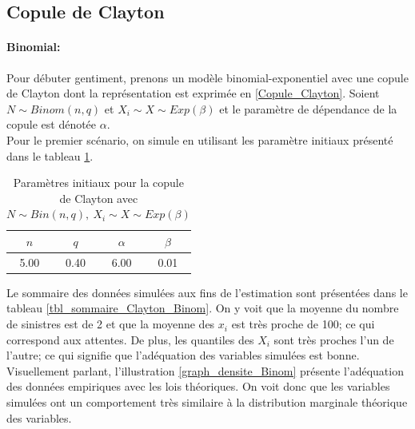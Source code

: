 \documentclass{article}
\begin{document}
	\subsection{Copule de Clayton}
	\paragraph{Binomial:}Pour débuter gentiment, prenons un modèle binomial-exponentiel avec une copule de Clayton dont la représentation est exprimée en \eqref{Copule_Clayton}.
	Soient $N \sim Binom(n,q)$ et $X_i \sim X \sim Exp(\beta)$ et le paramètre de dépendance de la copule est dénotée $\alpha$.\\
	
	 Pour le premier scénario, on simule en utilisant les paramètre initiaux présenté dans le tableau \ref{tbl_para_initiaux_Clayton_Binom}.
	 
	 \begin{table}[H]
	 	\centering
	 	\begin{tabular}{cccc}
	 		\hline
	 		$n$ & $q$ & $\alpha$ & $\beta$ \\ 
	 		\hline
	 		5.00 & 0.40 & 6.00 & 0.01 \\ 
	 		\hline
	 	\end{tabular}
 	\caption{Paramètres initiaux pour la copule de Clayton avec $N \sim Bin(n, q),\ X_i \sim X \sim Exp(\beta)$}
 	\label{tbl_para_initiaux_Clayton_Binom}
	 \end{table}
	 
	 Le sommaire des données simulées aux fins de l'estimation sont présentées dans le tableau \ref{tbl_sommaire_Clayton_Binom}. On y voit que la moyenne du nombre de sinistres est de 2 et que la moyenne des $x_i$ est très proche de 100; ce qui correspond aux attentes.
	 De plus, les quantiles des $X_i$ sont très proches l'un de l'autre; ce qui signifie que l'adéquation des variables simulées est bonne. Visuellement parlant, l'illustration \ref{graph_densite_Binom} présente l'adéquation des données empiriques avec les lois théoriques. On voit donc que les variables simulées ont un comportement très similaire à la distribution marginale théorique des variables.\\
	
\end{document}
